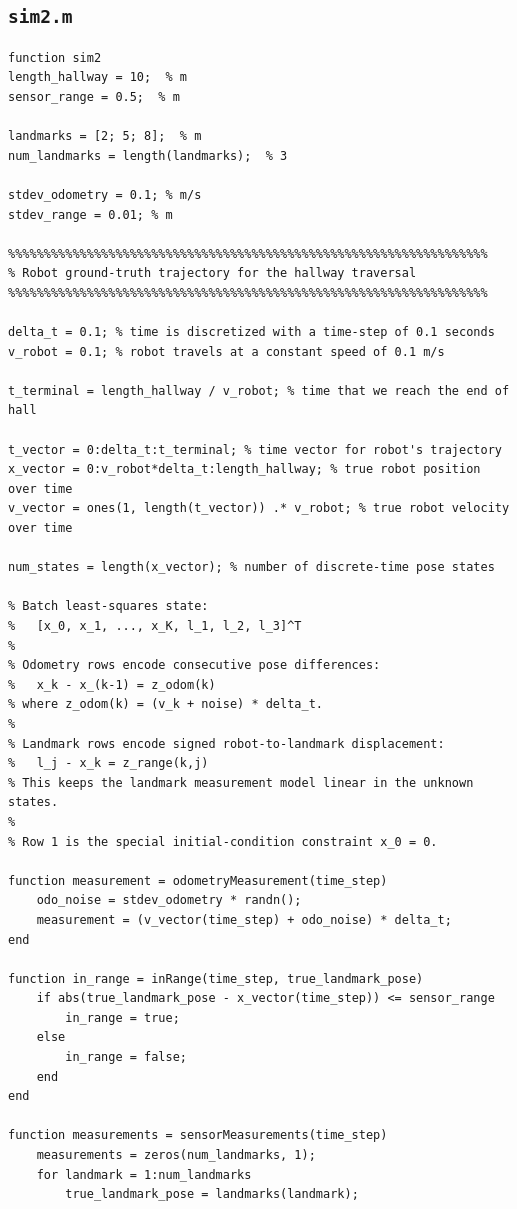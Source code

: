 \documentclass[11pt]{article}
\begin{document}
\subsection*{\texttt{sim2.m}}
\begin{lstlisting}[caption={sim2.m}, label={lst:sim2}]
function sim2
length_hallway = 10;  % m
sensor_range = 0.5;  % m

landmarks = [2; 5; 8];  % m
num_landmarks = length(landmarks);  % 3

stdev_odometry = 0.1; % m/s
stdev_range = 0.01; % m

%%%%%%%%%%%%%%%%%%%%%%%%%%%%%%%%%%%%%%%%%%%%%%%%%%%%%%%%%%%%%%%%%%%
% Robot ground-truth trajectory for the hallway traversal
%%%%%%%%%%%%%%%%%%%%%%%%%%%%%%%%%%%%%%%%%%%%%%%%%%%%%%%%%%%%%%%%%%%

delta_t = 0.1; % time is discretized with a time-step of 0.1 seconds
v_robot = 0.1; % robot travels at a constant speed of 0.1 m/s

t_terminal = length_hallway / v_robot; % time that we reach the end of hall

t_vector = 0:delta_t:t_terminal; % time vector for robot's trajectory
x_vector = 0:v_robot*delta_t:length_hallway; % true robot position over time
v_vector = ones(1, length(t_vector)) .* v_robot; % true robot velocity over time

num_states = length(x_vector); % number of discrete-time pose states

% Batch least-squares state:
%   [x_0, x_1, ..., x_K, l_1, l_2, l_3]^T
%
% Odometry rows encode consecutive pose differences:
%   x_k - x_(k-1) = z_odom(k)
% where z_odom(k) = (v_k + noise) * delta_t.
%
% Landmark rows encode signed robot-to-landmark displacement:
%   l_j - x_k = z_range(k,j)
% This keeps the landmark measurement model linear in the unknown states.
%
% Row 1 is the special initial-condition constraint x_0 = 0.

function measurement = odometryMeasurement(time_step)
    odo_noise = stdev_odometry * randn();
    measurement = (v_vector(time_step) + odo_noise) * delta_t;
end

function in_range = inRange(time_step, true_landmark_pose)
    if abs(true_landmark_pose - x_vector(time_step)) <= sensor_range
        in_range = true;
    else
        in_range = false;
    end
end

function measurements = sensorMeasurements(time_step)
    measurements = zeros(num_landmarks, 1);
    for landmark = 1:num_landmarks
        true_landmark_pose = landmarks(landmark);


\end{lstlisting}
\end{document}
